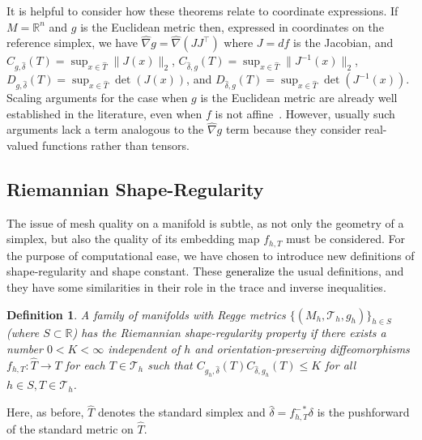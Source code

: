 \documentclass[11pt]{article}
\newtheorem{definition}[theorem]{Definition}
\newcommand{\correction}[2]{\textcolor{red}{}\textcolor{black}{#2}}
\begin{document}
It is helpful to consider how these theorems relate to coordinate expressions. If $M = \mathbb{R}^n$ and $g$ is the Euclidean metric then, expressed in coordinates on the reference simplex, we have $\hat\nabla g = \hat\nabla (JJ^\intercal)$ where $J = df$ is the Jacobian, and $C_{g,\hat\delta}(T) = \sup_{x \in \hat{T}}\|J(x)\|_2$, $C_{\hat\delta,g}(T) = \sup_{x \in \hat{T}}\|J^{-1}(x)\|_2$, $D_{g,\hat\delta}(T) = \sup_{x \in \hat{T}} \det(J(x))$, and $D_{\hat\delta,g}(T) = \sup_{x \in \hat{T}}\det(J^{-1}(x))$. Scaling arguments for the case when $g$ is the Euclidean metric are already well established in the literature, even when $f$ is not affine~\cite{bernardi1989optimal,kawecki2019finiteelementtheorycurved,evans2011icesreport1117}. However, usually such arguments lack a term analogous to the $\hat\nabla g$ term because they consider real-valued functions rather than tensors.


\subsection{Riemannian Shape-Regularity}\label{shapereg_section}

The issue of mesh quality on a manifold is subtle, as not only the geometry of a simplex, but also the quality of its embedding map $f_{h,T}$ must be considered. For the purpose of computational ease, we have chosen to introduce  new definitions of shape-regularity and shape constant. These \correction{are equivalent to}{generalize} the usual definitions\correction{ if each $T$ is a flat simplex in some Euclidean space and the map $f_{h,T}$ is affine}{}, and they have some similarities in their role in the trace and inverse inequalities.

\begin{definition}\label{shaperegdef}
A family of manifolds with Regge metrics $\{(M_h,\mathcal{T}_h,g_h)\}_{h \in S}$ (where $S \subset \mathbb{R}$) has the \emph{Riemannian shape-regularity property} if there exists a number $0 < K < \infty$ independent of $h$ and orientation-preserving diffeomorphisms $f_{h,T}: \hat T \to T$ for each $T \in \mathcal{T}_h$ such that $C_{g_h,\hat \delta}(T)C_{\hat \delta,g_h}(T) \le K$ for all $h \in S, T \in \mathcal{T}_h$.
\end{definition}


Here, as before, $\hat{T}$ denotes the standard simplex and $\hat \delta = f_{h,T}^{-*}\delta$ is the pushforward of the standard metric on $\hat T$.
\end{document}
